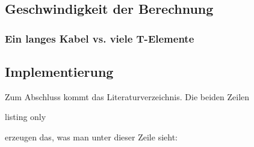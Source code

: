 \subsection{Geschwindigkeit der Berechnung}

\subsubsection{Ein langes Kabel vs. viele T-Elemente}

\subsection{Implementierung}




\label{sec:summary}

Zum Abschluss kommt das Literaturverzeichnis.
%
Die beiden Zeilen

\begin{tcblisting}{listing only}
  
  
\end{tcblisting}

erzeugen das, was man unter dieser Zeile sieht:





